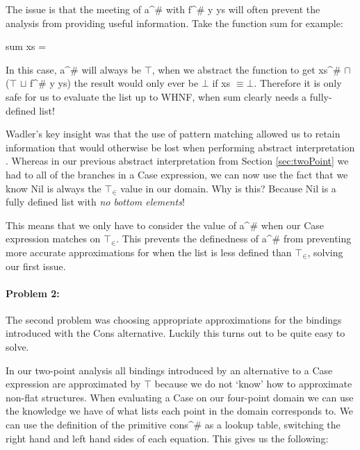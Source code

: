 The issue is that the \<meet\>ing of \<a^{\#}\> with \<f^{\#} y ys\> will often
prevent the analysis from providing useful information. Take the function
\<sum\> for example:

\begin{haskell*}
sum xs = 
\end{haskell*}

In this case, \<a^{\#}\> will always be $\top$, when we abstract the function
to get \<xs^{\#} \(\sqcap\) (\(\top\) \(\sqcup\) f^{\#} y ys)\> the result
would only ever be $\bot$ if \<xs \(\equiv \bot\)\>. Therefore it is only safe
for us to evaluate the list up to WHNF, when \<sum\> clearly needs a
fully-defined list!

Wadler's key insight was that the use of pattern matching allowed us to retain
information that would otherwise be lost when performing abstract
interpretation \citep{wadler1987strictness}. Whereas in our previous abstract
interpretation from Section \ref{sec:twoPoint} we had to \join all of the
branches in a \<Case\> expression, we can now use the fact that we know \<Nil\>
is always the $\top_{\in}$ value in our domain.  Why is this?  Because \<Nil\>
is a fully defined list with \emph{no bottom elements}!

This means that we only have to consider the value of \<a^{\#}\> when our
\<Case\> expression matches on $\top_{\in}$. This prevents the definedness
of \<a^{\#}\> from preventing more accurate approximations for when the list is
less defined than $\top_{\in}$, solving our first issue.

\paragraph{Problem 2:} The second problem was choosing appropriate approximations
for the bindings introduced with the \<Cons\> alternative. Luckily this turns out
to be quite easy to solve.

In our two-point analysis all bindings introduced by an alternative to a
\<Case\> expression are approximated by $\top$ because we do not `know' how to
approximate non-flat structures. When evaluating a \<Case\> on our four-point
domain we can use the knowledge we have of what lists each point in the domain
corresponds to. We can use the definition of the primitive \<cons^{\#}\> as
a lookup table, switching the right hand and left hand sides of each equation.
This gives us the following:

